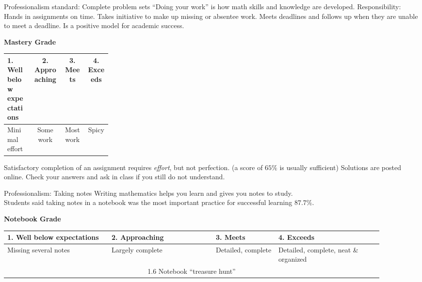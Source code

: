 \begin{frame}{Professionalism standard: Complete problem sets}
  {``Doing your work'' is how math skills and knowledge are developed.}
  Responsibility: Hands in assignments on time. Takes initiative to make up missing or absentee work. Meets deadlines and follows up when they are unable to meet a deadline. Is a positive model for academic success.

    \begin{table}[ht]
      \textbf{Mastery Grade}
    \begin{tabular}[t]{p{0.25\linewidth} c c c }%
      \hline
      1. Well below \newline expectations & 2. Approaching & 3. Meets & 4. Exceeds \\
      \hline
      \hspace{0.25cm} Minimal effort & Some work & Most work & Spicy \\[0.25cm]
      \hline
    \end{tabular}
  \end{table} \vspace{0.25cm}
    Satisfactory completion of an assignment requires \emph{effort}, but not perfection. (a score of $65\%$ is usually sufficient) Solutions are posted online. Check your answers and ask in class if you still do not understand.
    \vspace{1cm}
  \end{frame}

\begin{frame}{Professionalism: Taking notes}
  Writing mathematics helps you learn and gives you notes to study.\\[0.25cm]
    Students said taking notes in a notebook was the most important practice for successful learning $87.7\%$. \vspace{0.5cm}
    \begin{table}[ht]
      \textbf{Notebook Grade}
      \begin{tabular}[t]{p{0.25\linewidth} p{0.25\linewidth} p{0.15\linewidth} p{0.25\linewidth}}
        \hline
        1. Well below \newline expectations & 2. Approaching & 3. Meets & 4. Exceeds \\
        \hline
        Missing several notes & Largely complete & Detailed, \newline complete & Detailed, complete, neat \& organized \\[0.25cm]
        \multicolumn{4}{c}{1.6 Notebook ``treasure hunt''} \\[0.25cm]
        \hline
      \end{tabular}
    \end{table} \vspace{0.25cm}
\end{frame}

